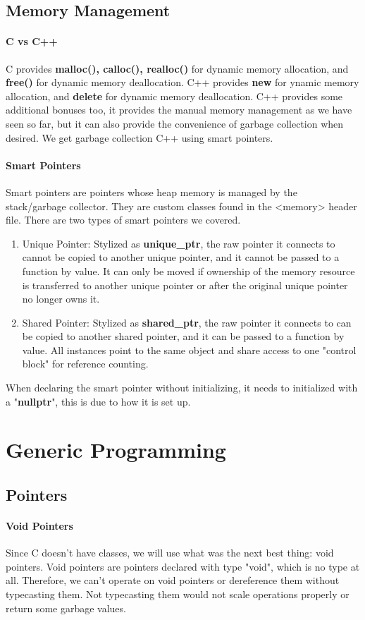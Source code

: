\subsection{Memory Management}
\paragraph{C vs C++}
C provides \textbf{malloc(), calloc(), realloc()} for dynamic memory allocation, and \textbf{free()} for dynamic memory deallocation. C++ provides \textbf{new} for ynamic memory allocation, and \textbf{delete} for dynamic memory deallocation. C++ provides some additional bonuses too, it provides the manual memory management as we have seen so far, but it can also provide the convenience of garbage collection when desired. We get garbage collection C++ using smart pointers.
\paragraph{Smart Pointers} Smart pointers are pointers whose heap memory is managed by the stack/garbage collector. They are custom classes found in the <memory> header file. There are two types of smart pointers we covered.
\begin{enumerate}
	\item Unique Pointer: Stylized as \textbf{unique\_ptr}, the raw pointer it connects to cannot be copied to another unique pointer, and it cannot be passed to a function by value. It can only be moved if ownership of the memory resource is transferred to another unique pointer or after the original unique pointer no longer owns it.
	\item Shared Pointer: Stylized as \textbf{shared\_ptr}, the raw pointer it connects to can be copied to another shared pointer, and it can be passed to a function by value. All instances point to the same object and share access to one "control block" for reference counting.
\end{enumerate}
When declaring the smart pointer without initializing, it needs to initialized with a "\textbf{nullptr}", this is due to how it is set up.

\section{Generic Programming}
\subsection{Pointers}
\paragraph{Void Pointers} Since C doesn't have classes, we will use what was the next best thing: void pointers. Void pointers are pointers declared with type "void", which is no type at all. Therefore, we can't operate on void pointers or dereference them without typecasting them. Not typecasting them would not scale operations properly or return some garbage values.
